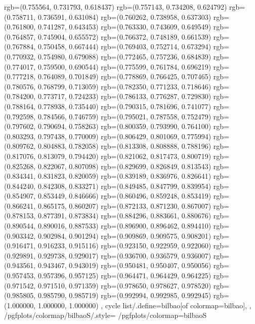 {{{					rgb=(0.755564, 0.731793, 0.618437)
					rgb=(0.757143, 0.734208, 0.624792)
					rgb=(0.758711, 0.736591, 0.631084)
					rgb=(0.760262, 0.738958, 0.637303)
					rgb=(0.761800, 0.741287, 0.643453)
					rgb=(0.763330, 0.743609, 0.649549)
					rgb=(0.764857, 0.745904, 0.655572)
					rgb=(0.766372, 0.748189, 0.661539)
					rgb=(0.767884, 0.750458, 0.667444)
					rgb=(0.769403, 0.752714, 0.673294)
					rgb=(0.770932, 0.754980, 0.679088)
					rgb=(0.772465, 0.757236, 0.684839)
					rgb=(0.774017, 0.759500, 0.690544)
					rgb=(0.775599, 0.761784, 0.696219)
					rgb=(0.777218, 0.764089, 0.701849)
					rgb=(0.778869, 0.766425, 0.707465)
					rgb=(0.780576, 0.768799, 0.713059)
					rgb=(0.782350, 0.771233, 0.718646)
					rgb=(0.784200, 0.773717, 0.724233)
					rgb=(0.786133, 0.776287, 0.729830)
					rgb=(0.788164, 0.778938, 0.735440)
					rgb=(0.790315, 0.781696, 0.741077)
					rgb=(0.792598, 0.784566, 0.746759)
					rgb=(0.795021, 0.787558, 0.752479)
					rgb=(0.797602, 0.790694, 0.758263)
					rgb=(0.800359, 0.793990, 0.764100)
					rgb=(0.803293, 0.797438, 0.770009)
					rgb=(0.806429, 0.801069, 0.775994)
					rgb=(0.809762, 0.804883, 0.782058)
					rgb=(0.813308, 0.808888, 0.788196)
					rgb=(0.817076, 0.813079, 0.794420)
					rgb=(0.821062, 0.817473, 0.800719)
					rgb=(0.825268, 0.822067, 0.807098)
					rgb=(0.829699, 0.826849, 0.813543)
					rgb=(0.834341, 0.831823, 0.820059)
					rgb=(0.839189, 0.836976, 0.826641)
					rgb=(0.844240, 0.842308, 0.833271)
					rgb=(0.849485, 0.847799, 0.839954)
					rgb=(0.854907, 0.853449, 0.846666)
					rgb=(0.860496, 0.859248, 0.853419)
					rgb=(0.866241, 0.865175, 0.860207)
					rgb=(0.872133, 0.871230, 0.867007)
					rgb=(0.878153, 0.877391, 0.873834)
					rgb=(0.884296, 0.883661, 0.880676)
					rgb=(0.890544, 0.890016, 0.887533)
					rgb=(0.896900, 0.896462, 0.894410)
					rgb=(0.903342, 0.902984, 0.901294)
					rgb=(0.909869, 0.909575, 0.908201)
					rgb=(0.916471, 0.916233, 0.915116)
					rgb=(0.923150, 0.922959, 0.922060)
					rgb=(0.929891, 0.929738, 0.929017)
					rgb=(0.936700, 0.936579, 0.936007)
					rgb=(0.943561, 0.943467, 0.943019)
					rgb=(0.950481, 0.950407, 0.950056)
					rgb=(0.957453, 0.957396, 0.957125)
					rgb=(0.964471, 0.964429, 0.964225)
					rgb=(0.971542, 0.971510, 0.971359)
					rgb=(0.978650, 0.978627, 0.978520)
					rgb=(0.985805, 0.985790, 0.985719)
					rgb=(0.992994, 0.992985, 0.992945)
					rgb=(1.000000, 1.000000, 1.000000)
			},
		cycle list/.define={bilbao}{[of colormap=bilbao]},
		},
		/pgfplots/colormap/bilbaoS/.style={
			/pgfplots/colormap={bilbaoS}{%
}}}
